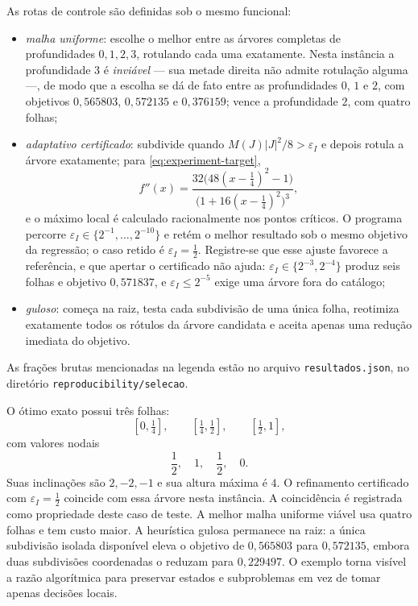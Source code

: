 As rotas de controle são definidas sob o mesmo funcional:
\begin{itemize}[leftmargin=1.7em]
 \item \emph{malha uniforme}: escolhe o melhor entre as árvores completas de
 profundidades $0,1,2,3$, rotulando cada uma exatamente. Nesta instância a
 profundidade $3$ é \emph{inviável} --- sua metade direita não admite
 rotulação alguma ---, de modo que a escolha se dá de fato entre as
 profundidades $0$, $1$ e $2$, com objetivos $0{,}565803$, $0{,}572135$ e
 $0{,}376159$; vence a profundidade $2$, com quatro folhas;
 \item \emph{adaptativo certificado}: subdivide quando
 $M(J)|J|^2/8>\varepsilon_I$ e depois rotula a árvore exatamente; para
 \eqref{eq:experiment-target},
 \[
 f''(x)=
 \frac{32\bigl(48(x-\tfrac14)^2-1\bigr)}
      {\bigl(1+16(x-\tfrac14)^2\bigr)^3},
 \]
 e o máximo local é calculado racionalmente nos pontos críticos. O programa
 percorre $\varepsilon_I\in\{2^{-1},\dots,2^{-10}\}$ e retém o melhor
 resultado sob o mesmo objetivo da regressão; o caso retido é
 $\varepsilon_I=\tfrac12$. Registre-se que esse ajuste favorece a referência,
 e que apertar o certificado não ajuda: $\varepsilon_I\in\{2^{-3},2^{-4}\}$
 produz seis folhas e objetivo $0{,}571837$, e $\varepsilon_I\le2^{-5}$ exige
 uma árvore fora do catálogo;
 \item \emph{guloso}: começa na raiz, testa cada subdivisão de uma única folha,
 reotimiza exatamente todos os rótulos da árvore candidata e aceita apenas
 uma redução imediata do objetivo.
\end{itemize}

\begin{table}[t]
 \centering
 \caption{Regressão sob o mesmo custo racional. Os decimais arredondam a seis
 casas as frações brutas dos campos \texttt{loss\_exact} e
 \texttt{cost\_exact} do arquivo suplementar \texttt{resultados.json}.
 ``Erro quadrático'' é a soma ponderada dos resíduos quadráticos, não a sua
 média; a tabela não constitui um benchmark de desempenho.}
 \label{tab:selector-comparison}
 \small
 
\end{table}

As frações brutas mencionadas na legenda estão no arquivo
\texttt{resultados.json}, no diretório \texttt{reproducibility/selecao}.

O ótimo exato possui três folhas:
\[
 [0,\tfrac14],\qquad[\tfrac14,\tfrac12],\qquad[\tfrac12,1],
\]
com valores nodais
\[
 \frac12,\quad1,\quad\frac12,\quad0.
\]
Suas inclinações são $2,-2,-1$ e sua altura máxima é $4$. O refinamento
certificado com $\varepsilon_I=\tfrac12$ coincide com essa árvore nesta
instância. A coincidência é registrada como propriedade deste caso de teste.
A melhor malha uniforme viável usa quatro folhas e tem
custo maior. A heurística gulosa permanece na raiz: a única subdivisão isolada
disponível eleva o objetivo de $0{,}565803$ para $0{,}572135$, embora duas
subdivisões coordenadas o reduzam para $0{,}229497$. O exemplo torna
visível a razão algorítmica para preservar estados e subproblemas em vez de
tomar apenas decisões locais.

